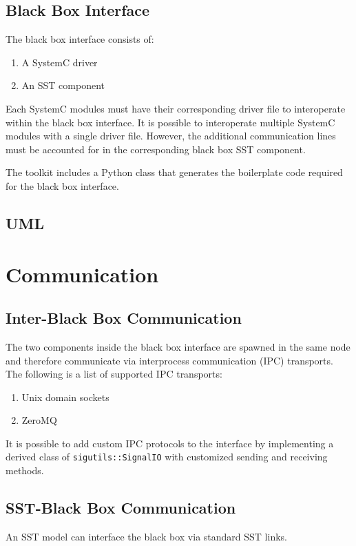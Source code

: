 \documentclass{article}
\begin{document}
    \subsection{Black Box Interface}
    The black box interface consists of:
    \begin{enumerate}
        \item A SystemC driver
        \item An SST component
    \end{enumerate}

    Each SystemC modules must have their corresponding driver file to interoperate within the black
    box interface. It is possible to interoperate multiple SystemC modules with a single driver
    file. However, the additional communication lines must be accounted for in the corresponding
    black box SST component.

    The toolkit includes a Python class that generates the boilerplate code required for the black
    box interface.

    \subsection{UML}

  \section{Communication}

    \subsection{Inter-Black Box Communication}
    The two components inside the black box interface are spawned in the same node and therefore
    communicate via interprocess communication (IPC) transports. The following is a list of
    supported IPC transports:
    \begin{enumerate}
      \item Unix domain sockets
      \item ZeroMQ
    \end{enumerate}

    It is possible to add custom IPC protocols to the interface by implementing a derived class of
    \lstinline{sigutils::SignalIO} with customized sending and receiving methods.

    \subsection{SST-Black Box Communication}
    An SST model can interface the black box via standard SST links.
\end{document}
